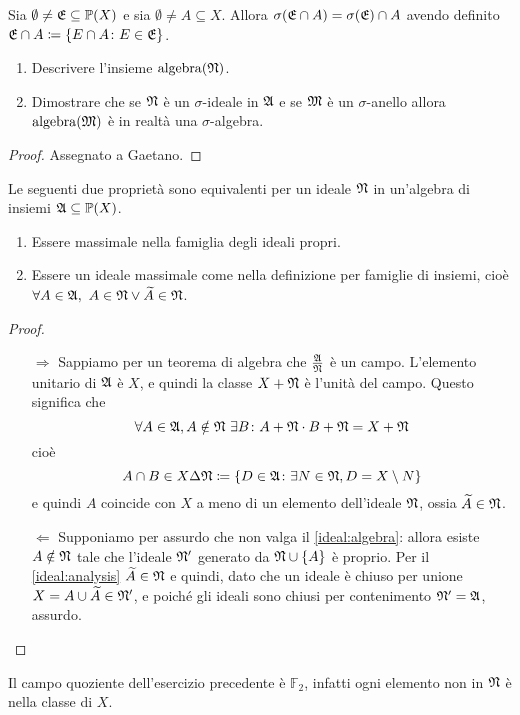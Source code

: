 \documentclass[../EserciziIstituzioniAnalisi.tex]{subfiles}
\begin{document}
\begin{exercise}[2016-10-13]
  Sia $\emptyset \neq \mathfrak E \subseteq \mathbb P(X)$ e sia $\emptyset \neq A \subseteq X$.
Allora $\sigma(\mathfrak E \cap A) = \sigma(\mathfrak E) \cap A$ avendo definito $\mathfrak E \cap A \coloneqq \left\lbrace E \cap A \colon E \in \mathfrak E\right\rbrace$.
\begin{enumerate}
\item Descrivere l'insieme $\operatorname{algebra}(\mathfrak N)$.
\item Dimostrare che se $\mathfrak N$ è un $\sigma$-ideale in $\mathfrak A$ e se $\mathfrak M$ è un $\sigma$-anello allora $\operatorname{algebra}(\mathfrak M)$ è in realtà una $\sigma$-algebra.
\end{enumerate}
\end{exercise}
\begin{proof}
Assegnato a Gaetano.
\end{proof}

\begin{exercise}[13/10/2016]
  Le seguenti due proprietà sono equivalenti per un ideale $\mathfrak N$ in un'algebra di insiemi $\mathfrak A \subseteq \mathbb P(X)$.
  \begin{enumerate}
    \item \label{ideal:algebra} Essere massimale nella famiglia degli ideali propri. 
    \item \label{ideal:analysis} Essere un ideale massimale come nella definizione per famiglie di insiemi, cioè $\forall A\in \mathfrak A,\ A\in\mathfrak N \lor \widetilde{A}\in\mathfrak N$.
  \end{enumerate}
\end{exercise}
\begin{proof}
  \begin{itemize}
    \item[$\Rightarrow$] Sappiamo per un teorema di algebra che $\frac{\mathfrak A}{\mathfrak N}$ è un campo. L'elemento unitario di $\mathfrak A$ è $X$, e quindi la classe $X+\mathfrak N$ è l'unità del campo.  
    Questo significa che
    \begin{equation*}
      \forall A \in \mathfrak A, A \notin \mathfrak N\ \exists B \colon A+\mathfrak N \cdot B+\mathfrak N = X+\mathfrak N
    \end{equation*}
    cioè
    \begin{equation*}
      A \cap B \in X \Delta \mathfrak N \coloneqq \{D\in \mathfrak A \colon \exists N\in \mathfrak N, D = X\setminus N \}
    \end{equation*}
    e quindi $A$ coincide con $X$ a meno di un elemento dell'ideale $\mathfrak N$, ossia $\widetilde{A}\in \mathfrak N$.
    
    \item[$\Leftarrow$] Supponiamo per assurdo che non valga il \cref{ideal:algebra}: allora esiste $A\notin \mathfrak N$ tale che l'ideale $\mathfrak N'$ generato da $\mathfrak N\cup \{A\}$ è proprio. Per il \cref{ideal:analysis} $\widetilde{A}\in \mathfrak N$ e quindi, dato che un ideale è chiuso per unione $X=A\cup\widetilde{A}\in \mathfrak N'$, e poiché gli ideali sono chiusi per contenimento $\mathfrak N'=\mathfrak A$, assurdo.
  \end{itemize}
\end{proof}
\begin{remark}
  Il campo quoziente dell'esercizio precedente è $\mathbb{F}_2$, infatti ogni elemento non in $\mathfrak N$ è nella classe di $X$.
\end{remark}
\end{document}
